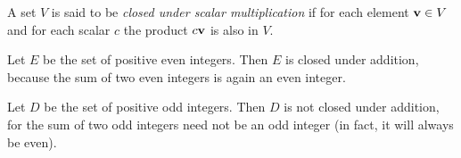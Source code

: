 \documentclass{ximera}
\renewcommand{\vec}[1]{{\bf #1}}
\begin{document}


  \begin{definition} 
  A set $V$ is said to be \emph{closed under scalar multiplication} if for each element $\vec{v} \in V$  and for each scalar $c$ the product $c\vec{v}$ is also in $V$.
\end{definition}


\begin{example}
Let $E$ be the set of positive even integers.  Then $E$ is closed under addition, because the sum of two even integers is again an even integer.
\end{example}

\begin{example}
Let $D$ be the set of positive odd integers.  Then $D$ is not closed under addition, for the sum of two odd integers need not be an odd integer (in fact, it will always be even).
\end{example}
\end{document}
